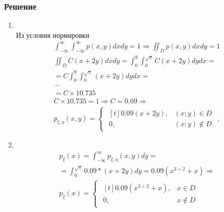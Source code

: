 \documentclass[12pt]{article}
\begin{document}

\subsubsection*{Решение}

\begin{enumerate}
	\item \mbox{}\\
	      Из условия нормировки
	      \begin{gather*}
		      \int_{-\infty}^{\infty}\int_{-\infty}^{\infty}p(x,y)dxdy = 1 \Rightarrow \iint_{D}p(x,y)dxdy = 1 \\
		      \iint_{D}C(x + 2y)dxdy = \int_0^9\int_0^{\sqrt{x}}C(x + 2y)dydx = \\
		      = C\int_0^9\int_0^{\sqrt{x}}(x + 2y)dydx = \\
		      \cdots \\
		      = C \times 10.735 \\
		      C \times 10.735 = 1 \Rightarrow C = 0.09 \Rightarrow \\
		      p_{\xi,\eta}(x,y) =
		      \begin{cases}
			      \begin{aligned}[t]
				      0.09(x + 2y), & (x;y) \in D    \\
				      0,            & (x;y) \notin D
			      \end{aligned}
		      \end{cases},
	      \end{gather*}

	\item \mbox{}\\
	      \begin{gather*}
		      p_{\xi}(x) = \int_{-\infty}^{\infty}p_{\xi,\eta}(x,y)dy = \\
		      = \int_{0}^{\sqrt{x}}0.09 * (x + 2y)dy = 0.09(x^{3\div2} + x) \Rightarrow \\
		      p_{\xi}(x) =
		      \begin{cases}
			      \begin{aligned}[t]
				      0.09(x^{3\div2} + x), & x \in D    \\
				      0,                    & x \notin D
			      \end{aligned}
		      \end{cases}
	      \end{gather*}


\end{enumerate}
\end{document}
